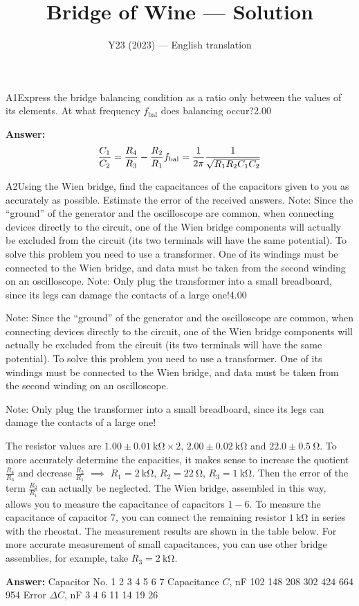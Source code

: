 \documentclass[11pt,a4paper]{article}
\title{\textbf{Bridge of Wine --- Solution}}
\author{\normalsize Y23 (2023) — English translation}
\date{}
\begin{document}
\maketitle\vspace{-0.5em}
\begin{solcard}{A1}{Express the bridge balancing condition as a ratio only between the values of its elements. At what frequency $f_\mathrm{bal}$ does balancing occur?}{2.00}
\par\smallskip\noindent\textbf{Answer:} \[\frac{C_1}{C_2}=\frac{R_4}{R_3}-\frac{R_2}{R_1}\\f_\text{bal}=\frac1{2\pi}\frac1{\sqrt{R_1R_2C_1C_2}}\]
\end{solcard}

\begin{solcard}{A2}{Using the Wien bridge, find the capacitances of the capacitors given to you as accurately as possible. Estimate the error of the received answers. Note: Since the “ground” of the generator and the oscilloscope are common, when connecting devices directly to the circuit, one of the Wien bridge components will actually be excluded from the circuit (its two terminals will have the same potential). To solve this problem you need to use a transformer. One of its windings must be connected to the Wien bridge, and data must be taken from the second winding on an oscilloscope. Note: Only plug the transformer into a small breadboard, since its legs can damage the contacts of a large one!}{4.00}

Note: Since the “ground” of the generator and the oscilloscope are common, when connecting devices directly to the circuit, one of the Wien bridge components will actually be excluded from the circuit (its two terminals will have the same potential). To solve this problem you need to use a transformer. One of its windings must be connected to the Wien bridge, and data must be taken from the second winding on an oscilloscope.


Note: Only plug the transformer into a small breadboard, since its legs can damage the contacts of a large one!


The resistor values are $1.00\pm0.01~\mathrm{k\Omega}\times2$, $2.00\pm0.02~\mathrm{k\Omega}$ and $22.0\pm0.5~\mathrm{\Omega}$. To more accurately determine the capacities, it makes sense to increase the quotient $\frac{R_4}{R_3}$ and decrease $\frac{R_2}{R_1}$ $\implies$ $R_1=2~\mathrm{k\Omega}$, $R_2=22~\mathrm{\Omega}$, $R_3=1~\mathrm{k\Omega}$. Then the error of the term $\frac{R_2}{R_1}$ can actually be neglected. The Wien bridge, assembled in this way, allows you to measure the capacitance of capacitors $1-6$. To measure the capacitance of capacitor $7$, you can connect the remaining resistor $1~\mathrm{k\Omega}$ in series with the rheostat. The measurement results are shown in the table below. For more accurate measurement of small capacitances, you can use other bridge assemblies, for example, take $R_3=2~\mathrm{k\Omega}$.

\par\smallskip\noindent\textbf{Answer:} Capacitor No. 1 2 3 4 5 6 7 Capacitance $C$, nF 102 148 208 302 424 664 954 Error $\Delta C$, nF 3 4 6 11 14 19 26
\end{solcard}
\end{document}
